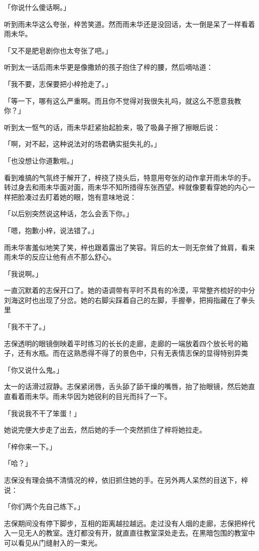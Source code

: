 \documentclass[UTF8]{ctexart}
\begin{document}
    「你说什么傻话啊。」

    听到雨未华这么夸张，梓苦笑道。然而雨未华还是没回话，太一倒是呆了一样看着雨未华。

    「又不是肥皂剧你也太夸张了吧。」

    听到太一话后雨未华更是像撒娇的孩子抱住了梓的腰，然后嘀咕道：

    「我不要，志保要把小梓抢走了。」

    「等一下，哪有这么严重啊。而且你不觉得对我很失礼吗，就这么不愿意我教你？」

    听到太一怄气的话，雨未华赶紧抬起脸来，吸了吸鼻子擦了擦眼后说：

    「啊，对不起，这种说法对的场君确实挺失礼的。」

    「也没想让你道歉啦。」

    看到难搞的气氛终于解开了，梓挠了挠头后，特意用夸张的动作拿开雨未华的手。转过身去和雨未华面对面，雨未华不知所措得东张西望。梓就像要看穿她的内心一样把脸凑过去盯着她的眼，饱有意味地说：

    「以后别突然说这种话，怎么会丢下你。」

    「嗯，抱歉小梓，说法错了。」

    雨未华害羞似地笑了笑，梓也跟着露出了笑容。背后的太一则无奈耸了耸肩，看来雨未华的反应让他有点不那么舒心。

    「我说啊。」

    一直沉默着的志保开口了。她的语调带有平时不具有的冷漠，平常整齐梳好的中分刘海这时也出现了分岔。她的右脚尖踩着自己的左脚，手握拳，把拇指藏在了拳头里

    「我不干了。」

    志保透明的眼镜倒映着平时练习的长长的走廊，走廊的一端放着四个放长号的箱子，还有水瓶。而在这熟悉得不得了的景色中，只有无表情志保的显得特别异类

    「你又说什么鬼。」

    太一的话滑过寂静。志保紧闭唇，舌头舔了舔干燥的嘴唇，抬了抬眼镜，然后她直直看着雨未华。雨未华因为她锐利的目光而抖了一下。

    「我说我不干了笨蛋！」

    她说完便大步走了出去，然后她的手一个突然抓住了梓将她拉走。

    「梓你来一下。」

    「哈？」

    志保没有理会搞不清情况的梓，依旧抓住她的手。在另外两人呆然的目送下，梓说：

    「你们两个先自己练下。」

    志保期间没有停下脚步，互相的距离越拉越远。走过没有人烟的走廊，志保把梓代入一见无人的教室。连灯都没有开，就直直往教室深处走去。在黑暗包围的教室中可以看见从门缝射入的一束光。
\end{document}
